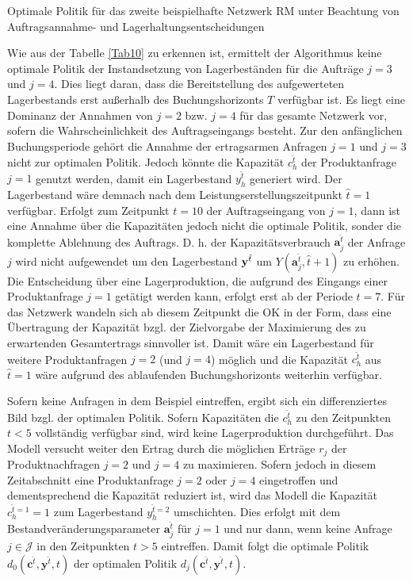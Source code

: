 \begin{table}
\renewcommand{\arraystretch}{1}
\begin{footnotesize}
     \caption{Optimale Politik für das zweite beispielhafte Netzwerk RM unter Beachtung von Auftragsannahme- und Lagerhaltungsentscheidungen} \label{Tab10}
        \begin{center}
      \end{center}
\end{footnotesize}
\end{table}

Wie aus der Tabelle \ref{Tab10} zu erkennen ist, ermittelt der Algorithmus keine optimale Politik der Instandsetzung von Lagerbeständen für die Aufträge $j=3$ und $j=4$. Dies liegt daran, dass die Bereitstellung des aufgewerteten Lagerbestands erst außerhalb des Buchungshorizonts $T$ verfügbar ist. Es liegt eine Dominanz der Annahmen von $j=2$ bzw. $j=4$ für das gesamte Netzwerk vor, sofern die Wahrscheinlichkeit des Auftragseingangs besteht. Zur den anfänglichen Buchungsperiode gehört die Annahme der ertragsarmen Anfragen $j=1$ und $j=3$ nicht zur optimalen Politik. Jedoch könnte die Kapazität $c_{h}^{\hat t}$ der Produktanfrage $j=1$ genutzt werden, damit ein Lagerbestand $y_{h}^{\hat t}$ generiert wird. Der Lagerbestand wäre demnach nach dem Leistungserstellungszeitpunkt $\hat{t}=1$ verfügbar. Erfolgt zum Zeitpunkt $t=10$ der Auftragseingang von $j=1$, dann ist eine Annahme über die Kapazitäten jedoch nicht die optimale Politik, sonder die komplette Ablehnung des Auftrags. D. h. der Kapazitätsverbrauch $\textbf{a}^{\hat t}_j$ der Anfrage $j$ wird nicht aufgewendet um den Lagerbestand $\textbf y^{\hat t}$ um $Y(\textbf{a}^{\hat t}_j,\hat t+1)$ zu erhöhen. Die Entscheidung über eine Lagerproduktion, die aufgrund des Eingangs einer Produktanfrage $j=1$ getätigt werden kann, erfolgt erst ab der Periode $t=7$. Für das Netzwerk wandeln sich ab diesem Zeitpunkt die OK in der Form, dass eine Übertragung der Kapazität bzgl. der Zielvorgabe der Maximierung des zu erwartenden Gesamtertrags sinnvoller ist. Damit wäre ein Lagerbestand für weitere Produktanfragen $j=2$ (und $j=4$) möglich und die Kapazität $c_{h}^{\hat t}$ aus $\hat{t}=1$ wäre aufgrund des ablaufenden Buchungshorizonts weiterhin verfügbar.

Sofern keine Anfragen in dem Beispiel eintreffen, ergibt sich ein differenziertes Bild bzgl. der optimalen Politik. Sofern Kapazitäten die $c_{h}^{\hat t}$ zu den Zeitpunkten $t<5$ vollständig verfügbar sind, wird keine Lagerproduktion durchgeführt. Das Modell versucht weiter den Ertrag durch die möglichen Erträge $r_j$ der Produktnachfragen $j=2$ und $j=4$ zu maximieren. Sofern jedoch in diesem Zeitabschnitt eine Produktanfrage $j=2$ oder $j=4$ eingetroffen und dementsprechend die Kapazität reduziert ist, wird das Modell die Kapazität $c_{h}^{\hat t=1}=1$ zum Lagerbestand $y_{h}^{\hat t=2}$ umschichten. Dies erfolgt mit dem Bestandveränderungsparameter $\textbf{a}_j^{\hat t}$ für $j=1$ und nur dann, wenn keine Anfrage $j\in\mathcal{J}$ in den Zeitpunkten $t>5$ eintreffen. Damit folgt die optimale Politik $d_{0}({\textbf{c}^{\hat t},\textbf{y}^{\hat t}, t})$ der optimalen Politik $d_{j}({\textbf{c}^{\hat t},\textbf{y}^{\hat t}, t})$.


